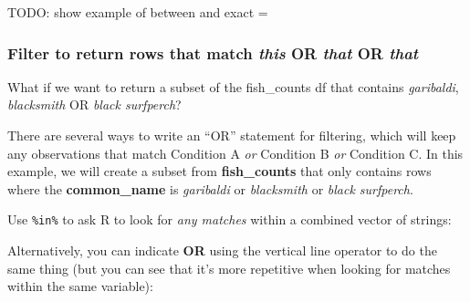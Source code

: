 \documentclass[]{book}
\newenvironment{Shaded}{\begin{snugshade}}{\end{snugshade}}
\newcommand{\KeywordTok}[1]{\textcolor[rgb]{0.13,0.29,0.53}{\textbf{#1}}}
\newcommand{\NormalTok}[1]{#1}
\newcommand{\OperatorTok}[1]{\textcolor[rgb]{0.81,0.36,0.00}{\textbf{#1}}}
\newcommand{\StringTok}[1]{\textcolor[rgb]{0.31,0.60,0.02}{#1}}
\begin{document}
TODO: show example of between and exact =

\hypertarget{filter-to-return-rows-that-match-this-or-that-or-that}{%
\subsubsection{\texorpdfstring{Filter to return rows that match \emph{this} OR \emph{that} OR \emph{that}}{Filter to return rows that match this OR that OR that}}\label{filter-to-return-rows-that-match-this-or-that-or-that}}

What if we want to return a subset of the fish\_counts df that contains \emph{garibaldi}, \emph{blacksmith} OR \emph{black surfperch}?

There are several ways to write an ``OR'' statement for filtering, which will keep any observations that match Condition A \emph{or} Condition B \emph{or} Condition C. In this example, we will create a subset from \textbf{fish\_counts} that only contains rows where the \textbf{common\_name} is \emph{garibaldi} or \emph{blacksmith} or \emph{black surfperch}.

Use \texttt{\%in\%} to ask R to look for \emph{any matches} within a combined vector of strings:

\begin{Shaded}
\end{Shaded}

Alternatively, you can indicate \textbf{OR} using the vertical line operator \texttt{\textbar{}} to do the same thing (but you can see that it's more repetitive when looking for matches within the same variable):

\begin{Shaded}
\end{Shaded}
\end{document}
